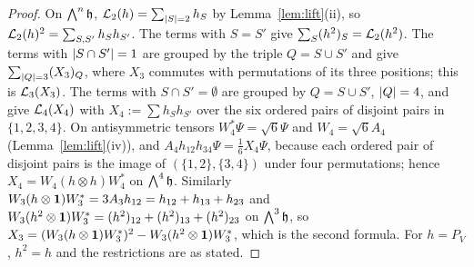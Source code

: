 \begin{proof}
On $\bigwedge^n\mathfrak{h}$, $\mathcal{L}_2(h)=\sum_{\lvert S\rvert=2}h_S$ by Lemma~\ref{lem:lift}(ii), so $\mathcal{L}_2(h)^2=\sum_{S,S'}h_Sh_{S'}$. The terms with
$S=S'$ give $\sum_S(h^2)_S=\mathcal{L}_2(h^2)$. The terms with $\lvert S\cap S'\rvert=1$ are grouped by the triple $Q=S\cup S'$ and give
$\sum_{\lvert Q\rvert=3}(X_3)_Q$, where $X_3$ commutes with permutations of its three positions; this is $\mathcal{L}_3(X_3)$. The terms with
$S\cap S'=\emptyset$ are grouped by $Q=S\cup S'$, $\lvert Q\rvert=4$, and give $\mathcal{L}_4(X_4)$ with $X_4:=\sum h_Sh_{S'}$ over the six ordered
pairs of disjoint pairs in $\{1,2,3,4\}$. On antisymmetric tensors $W_4^*\Psi=\sqrt6\Psi$ and $W_4=\sqrt6A_4$
(Lemma~\ref{lem:lift}(iv)), and $A_4h_{12}h_{34}\Psi=\frac16X_4\Psi$, because each ordered pair of disjoint pairs is the image of
$(\{1,2\},\{3,4\})$ under four permutations; hence $X_4=W_4(h\otimes h)W_4^*$ on $\bigwedge^4\mathfrak{h}$. Similarly
$W_3(h\otimes\mathbf{1})W_3^*=3A_3h_{12}=h_{12}+h_{13}+h_{23}$ and $W_3(h^2\otimes\mathbf{1})W_3^*=(h^2)_{12}+(h^2)_{13}+(h^2)_{23}$ on
$\bigwedge^3\mathfrak{h}$, so $X_3=(W_3(h\otimes\mathbf{1})W_3^*)^2-W_3(h^2\otimes\mathbf{1})W_3^*$, which is the second formula. For $h=P_V$,
$h^2=h$ and the restrictions are as stated.
\end{proof}
